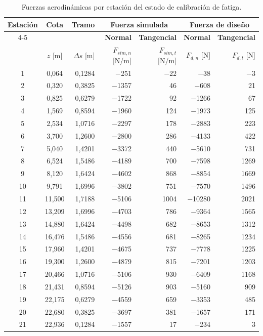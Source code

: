 \begin{table}[H]
    \centering
    \caption{Fuerzas aerodinámicas por estación del estado de calibración de fatiga.}
    \label{tab:anexo_fuerzas_calib}
    \begin{tabular}{ccrrrrr}
        \hline
        \textbf{Estación} & \textbf{Cota} & \textbf{Tramo} & \multicolumn{2}{c}{\textbf{Fuerza simulada}} & \multicolumn{2}{c}{\textbf{Fuerza de diseño}} \\
        \cline{4-5} \cline{6-7}
        & & & \textbf{Normal} & \textbf{Tangencial} & \textbf{Normal} & \textbf{Tangencial} \\
        & $z$ [m] & $\Delta s$ [m] & $F_{sim,n}$ [N/m] & $F_{sim,t}$ [N/m] & $F_{d,n}$ [N] & $F_{d,t}$ [N] \\
        \hline
        1 & 0{,}064 & 0{,}1284 & $-$251 & $-$22 & $-$38 & $-$3 \\
        2 & 0{,}320 & 0{,}3825 & $-$1357 & 46 & $-$608 & 21 \\
        3 & 0{,}825 & 0{,}6279 & $-$1722 & 92 & $-$1266 & 67 \\
        4 & 1{,}569 & 0{,}8594 & $-$1960 & 124 & $-$1973 & 125 \\
        5 & 2{,}534 & 1{,}0716 & $-$2297 & 178 & $-$2883 & 223 \\
        6 & 3{,}700 & 1{,}2600 & $-$2800 & 286 & $-$4133 & 422 \\
        7 & 5{,}040 & 1{,}4201 & $-$3372 & 440 & $-$5610 & 731 \\
        8 & 6{,}524 & 1{,}5486 & $-$4189 & 700 & $-$7598 & 1269 \\
        9 & 8{,}120 & 1{,}6424 & $-$4602 & 868 & $-$8854 & 1669 \\
        10 & 9{,}791 & 1{,}6996 & $-$3802 & 751 & $-$7570 & 1496 \\
        11 & 11{,}500 & 1{,}7188 & $-$5106 & 1004 & $-$10280 & 2021 \\
        12 & 13{,}209 & 1{,}6996 & $-$4703 & 786 & $-$9364 & 1565 \\
        13 & 14{,}880 & 1{,}6424 & $-$4498 & 682 & $-$8653 & 1312 \\
        14 & 16{,}476 & 1{,}5486 & $-$4556 & 681 & $-$8265 & 1234 \\
        15 & 17{,}960 & 1{,}4201 & $-$4675 & 737 & $-$7778 & 1225 \\
        16 & 19{,}300 & 1{,}2600 & $-$4879 & 815 & $-$7201 & 1203 \\
        17 & 20{,}466 & 1{,}0716 & $-$5106 & 930 & $-$6409 & 1168 \\
        18 & 21{,}431 & 0{,}8594 & $-$5126 & 903 & $-$5160 & 909 \\
        19 & 22{,}175 & 0{,}6279 & $-$4559 & 659 & $-$3353 & 485 \\
        20 & 22{,}680 & 0{,}3825 & $-$3697 & 381 & $-$1657 & 171 \\
        21 & 22{,}936 & 0{,}1284 & $-$1557 & 17 & $-$234 & 3 \\
        \hline
    \end{tabular}
\end{table}

